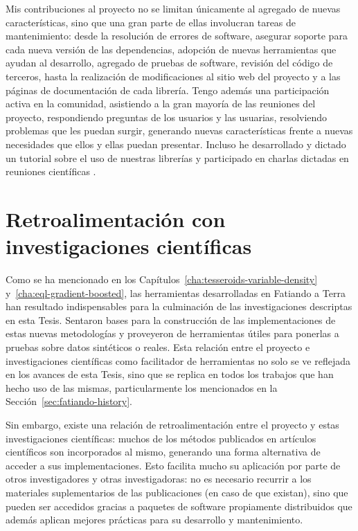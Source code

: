 Mis contribuciones al proyecto no se limitan únicamente al agregado de nuevas
características, sino que una gran parte de ellas involucran tareas de
mantenimiento: desde la resolución de errores de software, asegurar soporte
para cada nueva versión de las dependencias, adopción de nuevas herramientas
que ayudan al desarrollo, agregado de pruebas de software, revisión del código
de terceros, hasta la realización de modificaciones al sitio web del proyecto
y a las páginas de documentación de cada librería.
Tengo además una participación activa en la comunidad, asistiendo a la gran
mayoría de las reuniones del proyecto, respondiendo preguntas de los usuarios
y las usuarias, resolviendo problemas que les puedan surgir, generando nuevas
características frente a nuevas necesidades que ellos y ellas puedan presentar.
Incluso he desarrollado y dictado un tutorial sobre el uso de nuestras
librerías \citep{soler2021c} y participado en charlas dictadas en reuniones
científicas \citep{uieda2021,uieda2021b,uieda2021c}.


\section{Retroalimentación con investigaciones científicas}

Como se ha mencionado en los Capítulos~\ref{cha:tesseroids-variable-density}
y~\ref{cha:eql-gradient-boosted}, las herramientas desarrolladas en Fatiando
a Terra han resultado indispensables para la culminación de las investigaciones
descriptas en esta Tesis.
Sentaron bases para la construcción de las implementaciones de estas nuevas
metodologías y proveyeron de herramientas útiles para ponerlas a pruebas
sobre datos sintéticos o reales.
Esta relación entre el proyecto e investigaciones científicas como facilitador
de herramientas no solo se ve reflejada en los avances de esta Tesis, sino que
se replica en todos los trabajos que han hecho uso de las mismas,
particularmente los mencionados en la Sección~\ref{sec:fatiando-history}.

Sin embargo, existe una relación de retroalimentación entre el proyecto y estas
investigaciones científicas: muchos de los métodos publicados en artículos
científicos son incorporados al mismo, generando una forma alternativa de
acceder a sus implementaciones.
Esto facilita mucho su aplicación por parte de otros investigadores y otras
investigadoras: no es necesario recurrir a los materiales suplementarios de las
publicaciones (en caso de que existan), sino que pueden ser accedidos gracias
a paquetes de software propiamente distribuidos que además aplican mejores
prácticas para su desarrollo y mantenimiento.


